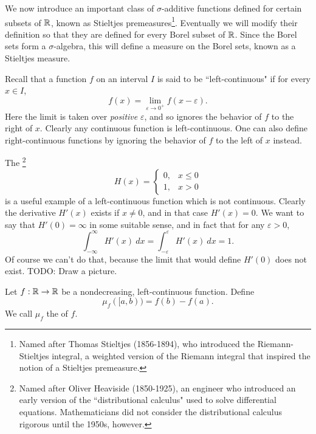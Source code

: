 \begin{subsec}
We now introduce an important class of $\sigma$-additive functions defined for certain subsets of $\mathbb{R}$, known as Stieltjes premeasures\footnote{Named after Thomas Stieltjes (1856-1894), who introduced the Riemann-Stieltjes integral, a weighted version of the Riemann integral that inspired the notion of a Stieltjes premeasure.}.
Eventually we will modify their definition so that they are defined for every Borel subset of $\mathbb{R}$.
Since the Borel sets form a $\sigma$-algebra, this will define a measure on the Borel sets, known as a Stieltjes measure.
\end{subsec}

\begin{subsec}
Recall that a function $f$ on an interval $I$ is said to be ``left-continuous" if for every $x \in I$,
\[f(x) = \lim_{\varepsilon \to 0^+} f(x - \varepsilon).\]
Here the limit is taken over \emph{positive} $\varepsilon$, and so ignores the behavior of $f$ to the right of $x$.
Clearly any continuous function is left-continuous.
One can also define right-continuous functions by ignoring the behavior of $f$ to the left of $x$ instead.
\end{subsec}

\begin{example}
The \footnote{Named after Oliver Heaviside (1850-1925), an engineer who introduced an early version of the ``distributional calculus" used to solve differential equations. Mathematicians did not consider the distributional calculus rigorous until the 1950s, however.}
$$H(x) = \begin{cases}
0, & x \leq 0\\
1, & x > 0
\end{cases}$$
is a useful example of a left-continuous function which is not continuous.
Clearly the derivative $H'(x)$ exists if $x \neq 0$, and in that case $H'(x) = 0$.
We want to say that $H'(0) = \infty$ in some suitable sense, and in fact that for any $\varepsilon > 0$,
\[\int_{-\infty}^\infty H'(x)~dx = \int_{-\varepsilon}^\varepsilon H'(x)~dx = 1.\]
Of course we can't do that, because the limit that would define $H'(0)$ does not exist.
TODO: Draw a picture.
\end{example}

\begin{definition}
Let $f: \mathbb{R} \to \mathbb{R}$ be a nondecreasing, left-continuous function.
Define
\[\mu_f([a, b)) = f(b) - f(a).\]
We call $\mu_f$ the  of $f$.
\end{definition}

